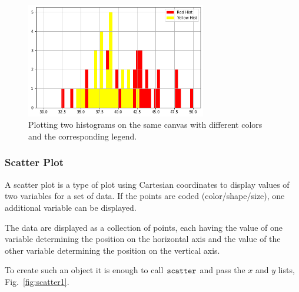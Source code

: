 \begin{figure}[htb]
	\centering
	\includegraphics[width=0.7\textwidth]{figures/histo3}
	\caption{Plotting two histograms on the same canvas with different colors and the 
		corresponding legend.}
	\label{fig:histo3}
\end{figure}

\subsubsection{Scatter Plot}\label{scatter}

A scatter plot is a type of plot using Cartesian coordinates to display
values of two variables for a set of data. If the points are
coded (color/shape/size), one additional variable can be displayed.

The data are displayed as a collection of points, each having the value
of one variable determining the position on the horizontal axis and the
value of the other variable determining the position on the vertical
axis.

To create such an object it is enough to call \(\tt{scatter}\) and pass
the \(x\) and \(y\) lists, Fig.~\ref{fig:scatter1}.


